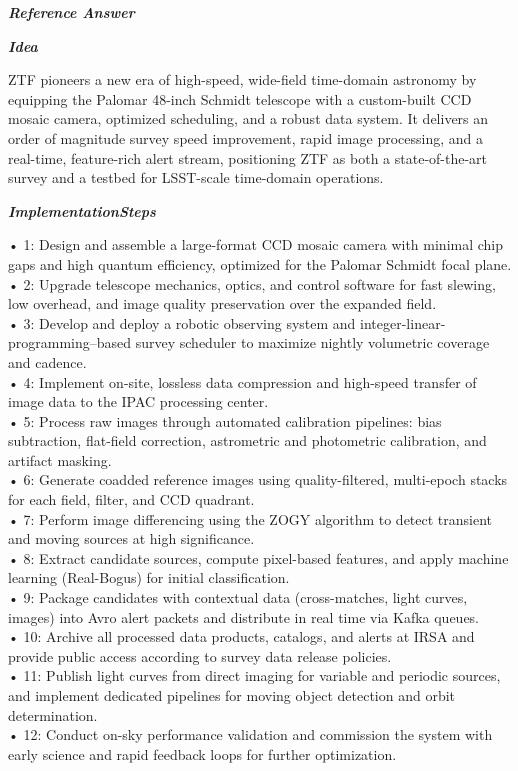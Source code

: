 \begin{tcolorbox}[
    breakable,
    title={Example of Idea Generation in Astronomy},
    colback=LighterGray,
    colframe=DeepPurple,
    colbacktitle=DeepPurple,
    coltitle=White,
]
\textbf{\emph{\textcolor{DeepPurple}{Reference Answer}}}

\textbf{\emph{\textcolor{CaseOrange}{Idea}}}

ZTF pioneers a new era of high-speed, wide-field time-domain astronomy by equipping the Palomar
48-inch Schmidt telescope with a custom-built CCD mosaic camera, optimized scheduling, and a robust
data system. It delivers an order of magnitude survey speed improvement, rapid image processing, and
a real-time, feature-rich alert stream, positioning ZTF as both a state-of-the-art survey and a
testbed for LSST-scale time-domain operations.

\textbf{\emph{\textcolor{CaseOrange}{ImplementationSteps}}}

• 1: Design and assemble a large-format CCD mosaic camera with minimal chip gaps and high quantum efficiency, optimized for the Palomar Schmidt focal plane. \\
• 2: Upgrade telescope mechanics, optics, and control software for fast slewing, low overhead, and image quality preservation over the expanded field. \\
• 3: Develop and deploy a robotic observing system and integer-linear-programming–based survey scheduler to maximize nightly volumetric coverage and cadence. \\
• 4: Implement on-site, lossless data compression and high-speed transfer of image data to the IPAC processing center. \\
• 5: Process raw images through automated calibration pipelines: bias subtraction, flat-field correction, astrometric and photometric calibration, and artifact masking. \\
• 6: Generate coadded reference images using quality-filtered, multi-epoch stacks for each field, filter, and CCD quadrant. \\
• 7: Perform image differencing using the ZOGY algorithm to detect transient and moving sources at high significance. \\
• 8: Extract candidate sources, compute pixel-based features, and apply machine learning (Real-Bogus) for initial classification. \\
• 9: Package candidates with contextual data (cross-matches, light curves, images) into Avro alert packets and distribute in real time via Kafka queues. \\
• 10: Archive all processed data products, catalogs, and alerts at IRSA and provide public access according to survey data release policies. \\
• 11: Publish light curves from direct imaging for variable and periodic sources, and implement dedicated pipelines for moving object detection and orbit determination. \\
• 12: Conduct on-sky performance validation and commission the system with early science and rapid feedback loops for further optimization. 


\end{tcolorbox}
